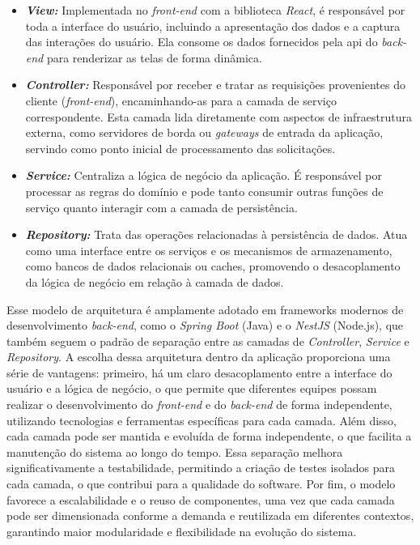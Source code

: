 \begin{itemize}
  \item \textbf{\emph{View:}} Implementada no \emph{front-end} com a biblioteca \emph{React}, é responsável por toda a interface do usuário, incluindo a apresentação dos dados e a captura das interações do usuário. Ela consome os dados fornecidos pela \gls{api} do \emph{back-end} para renderizar as telas de forma dinâmica.
  \item \textbf{\emph{Controller:}} Responsável por receber e tratar as requisições provenientes do cliente (\emph{front-end}), encaminhando-as para a camada de serviço correspondente. Esta camada lida diretamente com aspectos de infraestrutura externa,  como servidores de borda ou \emph{gateways} de entrada da aplicação, servindo como ponto inicial de processamento das solicitações.
  \item \textbf{\emph{Service:}} Centraliza a lógica de negócio da aplicação. É responsável por processar as regras do domínio e pode tanto consumir outras funções de serviço quanto interagir com a camada de persistência.
  \item \textbf{\emph{Repository:}} Trata das operações relacionadas à persistência de dados. Atua como uma interface entre os serviços e os mecanismos de armazenamento, como bancos de dados relacionais ou caches, promovendo o desacoplamento da lógica de negócio em relação à camada de dados.
\end{itemize}



Esse modelo de arquitetura é amplamente adotado em frameworks modernos de desenvolvimento \emph{back-end}, como o \emph{Spring Boot}\cite{SpringBootLayers} (Java) e o \emph{NestJS}\cite{NestJSLayers} (Node.js), que também seguem o padrão de separação entre  as camadas de \emph{Controller}, \emph{Service} e \emph{Repository}. A escolha dessa arquitetura dentro da aplicação proporciona uma série de vantagens: primeiro, há um claro desacoplamento entre a interface do usuário e a lógica de negócio, o que permite que diferentes equipes possam realizar o desenvolvimento do \emph{front-end} e do \emph{back-end} de forma independente, utilizando tecnologias e ferramentas específicas para cada camada. Além disso, cada camada pode ser mantida e evoluída de forma independente, o que facilita a manutenção do sistema ao longo do tempo. Essa separação melhora significativamente a testabilidade, permitindo a criação de testes isolados para cada camada, o que contribui para a qualidade do software. Por fim, o modelo favorece a escalabilidade e o reuso de componentes, uma vez que cada camada pode ser dimensionada conforme a demanda e reutilizada em diferentes contextos, garantindo maior modularidade e flexibilidade na evolução do sistema.


